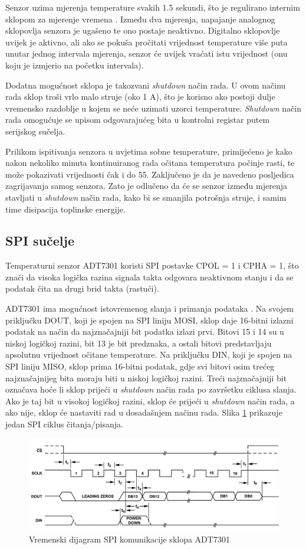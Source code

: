Senzor uzima mjerenja temperature svakih 1.5 sekundi, što je regulirano internim sklopom za mjerenje vremena . Između dva mjerenja, napajanje analognog sklopovlja senzora je ugašeno te ono postaje neaktivno. Digitalno sklopovlje uvijek je aktivno, ali ako se pokuša pročitati vrijednost temperature više puta unutar jednog intervala mjerenja, senzor će uvijek vraćati istu vrijednost (onu koju je izmjerio na početku intervala).

Dodatna mogućnost sklopa je takozvani \textit{shutdown} način rada. U ovom načinu rada sklop troši vrlo malo struje (oko 1 \textmu{}A), što je korisno ako postoji dulje vremensko razdoblje u kojem se neće uzimati uzorci temperature. \textit{Shutdown} način rada omogućuje se upisom odgovarajućeg bita u kontrolni registar putem serijskog sučelja.

Prilikom ispitivanja senzora u uvjetima sobne temperature, primijećeno je kako nakon nekoliko minuta kontinuiranog rada očitana temperatura počinje rasti, te može pokazivati vrijednosti čak i do 55\textcelsius{}. Zaključeno je da je navedeno posljedica zagrijavanja samog senzora. Zato je odlučeno da će se senzor između mjerenja stavljati u \textit{shutdown} način rada, kako bi se smanjila potrošnja struje, i samim time disipacija toplinske energije.

\subsection{SPI sučelje}
Temperaturni senzor ADT7301 koristi SPI postavke CPOL = 1 i CPHA = 1, što znači da visoka logička razina signala takta odgovara neaktivnom stanju i da se podatak čita na drugi brid takta (rastući).

ADT7301 ima mogućnost istovremenog slanja i primanja podataka . Na svojem priključku DOUT, koji je spojen na SPI liniju MOSI, sklop daje 16-bitni izlazni podatak na način da najznačajniji bit podatka izlazi prvi. Bitovi 15 i 14 su u niskoj logičkoj razini, bit 13 je bit predznaka, a ostali bitovi predstavljaju apsolutnu vrijednost očitane temperature. Na priključku DIN, koji je spojen na SPI liniju MISO, sklop prima 16-bitni podatak, gdje svi bitovi osim trećeg najznačajnijeg bita moraju biti u niskoj logičkoj razini. Treći najznačajniji bit označava hoće li sklop prijeći u \textit{shutdown} način rada po završetku ciklusa slanja. Ako je taj bit u visokoj logičkoj razini, sklop će prijeći u \textit{shutdown} način rada, a ako nije, sklop će nastaviti rad u dosadašnjem načinu rada. Slika \ref{fig:adt7301_spi} prikazuje jedan SPI ciklus čitanja/pisanja.

\begin{figure}[htb]
    \centering
    \includegraphics[width=\textwidth]{slike/ADT7301_spi.png}
    \caption{Vremenski dijagram SPI komunikacije sklopa ADT7301 \cite{adt7301_datasheet}}
    \label{fig:adt7301_spi}
\end{figure}
    
